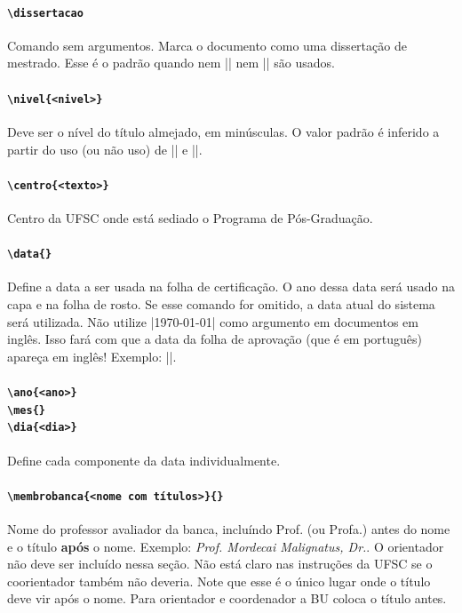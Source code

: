 \documentclass[embeddedlogo]{../ufsc-thesis-rn46-2019}
\begin{document}
\paragraph*{\texttt{\textbackslash{}dissertacao}} Comando sem argumentos. Marca
o documento como uma dissertação de mestrado. Esse é o padrão quando nem
\mt|\dissertacao| nem \mt|\tese| são usados.

\paragraph*{\texttt{\textbackslash{}nivel\{<nivel>\}}} Deve ser o nível do
título almejado, em minúsculas. O valor padrão é inferido a partir do uso (ou
não uso) de \mt|\tese| e \mt|\dissertacao|.

\paragraph*{\texttt{\textbackslash{}centro\{<texto>\}}} Centro da UFSC onde
está sediado o Programa de Pós-Graduação.

\paragraph*{\texttt{\textbackslash{}data\{<data por extenso>\}}} Define a data
a ser usada na folha de certificação. O ano dessa data será usado na capa e na
folha de rosto. Se esse comando for omitido, a data atual do sistema será
utilizada. Não utilize \mt|\today| como argumento em documentos em inglês. Isso
fará com que a data da folha de aprovação (que é em português) apareça em
inglês! Exemplo: \mt||.

\paragraph*{\texttt{\textbackslash{}ano\{<ano>\}} \\
            \texttt{\textbackslash{}mes\{<nome do mes>\}} \\
            \texttt{\textbackslash{}dia\{<dia>\}}}
Define cada componente da data individualmente.

\paragraph*{\texttt{\textbackslash{}membrobanca\{<nome com
títulos>\}\{<universidade por extenso>\}}}
Nome do professor avaliador da banca, incluíndo Prof. (ou Profa.) antes do
nome e o título \textbf{após} o nome. Exemplo: \emph{Prof. Mordecai
Malignatus, Dr.}. O orientador não deve ser incluído nessa seção. Não está
claro nas instruções da UFSC se o coorientador também não deveria. Note que
esse é o único lugar onde o título deve vir após o nome. Para orientador e
coordenador a BU coloca o título antes.
\end{document}
